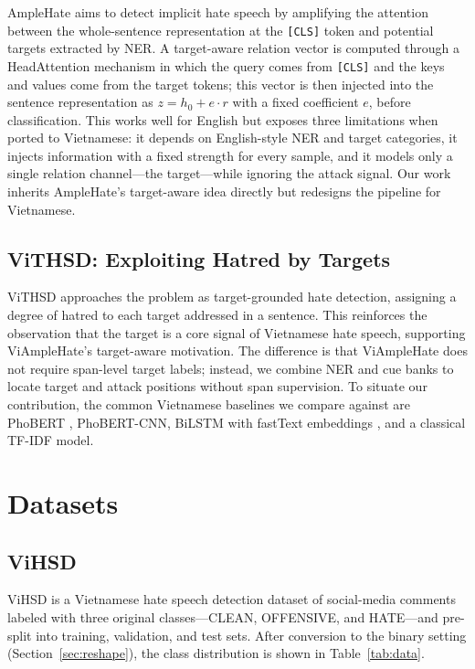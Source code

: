 \documentclass[11pt]{article}
\begin{document}
AmpleHate \citep{amplehate} aims to detect implicit hate speech by amplifying the attention between the whole-sentence representation at the \texttt{[CLS]} token and potential targets extracted by NER. A target-aware relation vector is computed through a HeadAttention mechanism in which the query comes from \texttt{[CLS]} and the keys and values come from the target tokens; this vector is then injected into the sentence representation as $z = h_0 + e\cdot r$ with a fixed coefficient $e$, before classification. This works well for English but exposes three limitations when ported to Vietnamese: it depends on English-style NER and target categories, it injects information with a fixed strength for every sample, and it models only a single relation channel---the target---while ignoring the attack signal. Our work inherits AmpleHate's target-aware idea directly but redesigns the pipeline for Vietnamese.

\subsection{ViTHSD: Exploiting Hatred by Targets}

ViTHSD \citep{vithsd} approaches the problem as target-grounded hate detection, assigning a degree of hatred to each target addressed in a sentence. This reinforces the observation that the target is a core signal of Vietnamese hate speech, supporting ViAmpleHate's target-aware motivation. The difference is that ViAmpleHate does not require span-level target labels; instead, we combine NER and cue banks to locate target and attack positions without span supervision. To situate our contribution, the common Vietnamese baselines we compare against are PhoBERT \citep{phobert}, PhoBERT-CNN, BiLSTM with fastText embeddings \citep{fasttext}, and a classical TF-IDF model.

\section{Datasets}

\subsection{ViHSD}

ViHSD \citep{vihsd} is a Vietnamese hate speech detection dataset of social-media comments labeled with three original classes---CLEAN, OFFENSIVE, and HATE---and pre-split into training, validation, and test sets. After conversion to the binary setting (Section~\ref{sec:reshape}), the class distribution is shown in Table~\ref{tab:data}.
\end{document}
